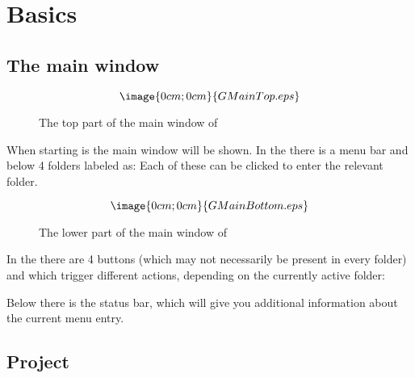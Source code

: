 \section{Basics}%
\label{basic.detailed}

\subsection{The main window}

\begin{figure}[h]
$$\image{0cm;0cm}{GMainTop.eps}$$%
\caption{The top part of the main window of \period}%
\label{mainframe.top}
\end{figure}
When starting \period is the main window will be shown.
In the  there is a menu bar and 
below 4 folders labeled as:
Each of these can be clicked to enter the relevant folder.

\begin{figure}[h]
$$\image{0cm;0cm}{GMainBottom.eps}$$%
\caption{The lower part of the main window of \period}%
\label{mainframe.bottom}
\end{figure}

In the 
 there are 4 buttons 
(which may not necessarily be present in every folder)
and which trigger different actions, depending on the 
currently active folder:

Below there is the status bar, which will give you additional 
information about the current menu entry.

\subsection{Project}%
\label{project.management}

